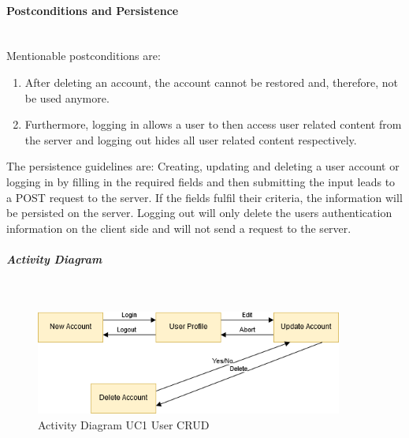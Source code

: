 \paragraph*{Postconditions and Persistence}\mbox{}\\
Mentionable postconditions are:
\begin{enumerate}
	\vspace{-3mm}
	\setlength\itemsep{-1em}
	\item After deleting an account, the account cannot be restored and, therefore, not be used anymore.
	\item Furthermore, logging in allows a user to then access user related content from the server and logging out hides all user related content respectively.
\end{enumerate}

\noindent
The persistence guidelines are: 
\newline
\noindent
Creating, updating and deleting a user account or logging in by filling in the required fields and then submitting the input leads to a POST request to the server. If the fields fulfil their criteria, the information will be persisted on the server. Logging out will only delete the users authentication information on the client side and will not send a request to the server.

\subparagraph{Activity Diagram}\mbox{}\\
\begin{figure}[H]
	\centering
	\includegraphics[width=0.9\textwidth]{Content/Domain/UC1UserCRUDactivitydiagram.png}
	\caption{Activity Diagram \ac{UC}1 User CRUD}
	\label{fig:activityDiagramUC1}
\end{figure}
